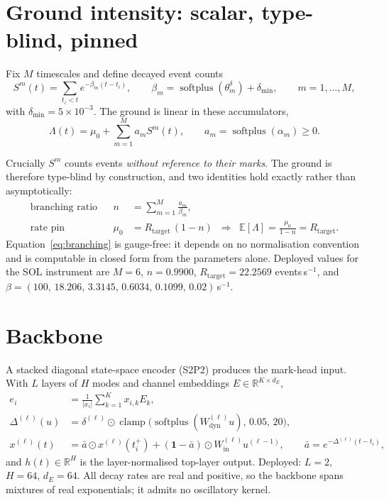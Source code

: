 \documentclass[11pt]{article}
\theoremstyle{remark}
\newcommand{\R}{\mathbb{R}}
\newcommand{\E}{\mathbb{E}}
\newcommand{\Rtar}{R_{\mathrm{target}}}
\newcommand{\softplus}{\operatorname{softplus}}
\begin{document}
\section{Ground intensity: scalar, type-blind, pinned}

Fix $M$ timescales and define decayed event counts
\begin{equation}
S^m(t)=\sum_{t_i<t}e^{-\beta_m(t-t_i)},
\qquad
\beta_m=\softplus(\theta^\delta_m)+\delta_{\min},
\qquad m=1,\dots,M,
\end{equation}
with $\delta_{\min}=5\times10^{-3}$. The ground is linear in these accumulators,
\begin{equation}
\boxed{\;\Lambda(t)=\mu_0+\sum_{m=1}^{M}a_m S^m(t),\qquad
a_m=\softplus(\alpha_m)\ge0 .\;}
\label{eq:ground}
\end{equation}

Crucially $S^m$ counts events \emph{without reference to their marks}. The
ground is therefore type-blind by construction, and two identities hold exactly
rather than asymptotically:
\begin{align}
\text{branching ratio}&& n&=\sum_{m=1}^{M}\frac{a_m}{\beta_m},
\label{eq:branching}\\[2pt]
\text{rate pin}&& \mu_0&=\Rtar\,(1-n)
\;\;\Longrightarrow\;\;
\E[\Lambda]=\frac{\mu_0}{1-n}=\Rtar .
\label{eq:pin}
\end{align}
Equation~\eqref{eq:branching} is gauge-free: it depends on no normalisation
convention and is computable in closed form from the parameters alone. Deployed
values for the SOL instrument are $M=6$, $n=0.9900$, $\Rtar=22.2569$
events\,s$^{-1}$, and
$\beta=(100,\,18.206,\,3.3145,\,0.6034,\,0.1099,\,0.02)$\,s$^{-1}$.

\section{Backbone}

A stacked diagonal state-space encoder (S2P2) produces the mark-head input.
With $L$ layers of $H$ modes and channel embeddings $E\in\R^{K\times d_E}$,
\begin{align}
e_i &= \frac{1}{|x_i|}\sum_{k=1}^{K}x_{i,k}E_k,\\
\Delta^{(\ell)}(u) &= \delta^{(\ell)}\odot
\operatorname{clamp}\!\big(\softplus(W^{(\ell)}_{\mathrm{dyn}}u),\,0.05,\,20\big),\\
x^{(\ell)}(t) &= \bar a\odot x^{(\ell)}(t_i^{+})
+(\mathbf{1}-\bar a)\odot W^{(\ell)}_{\mathrm{in}}u^{(\ell-1)},
\qquad \bar a=e^{-\Delta^{(\ell)}(t-t_i)},
\end{align}
and $h(t)\in\R^{H}$ is the layer-normalised top-layer output. Deployed:
$L=2$, $H=64$, $d_E=64$. All decay rates are real and positive, so the backbone
spans mixtures of real exponentials; it admits no oscillatory kernel.
\end{document}
